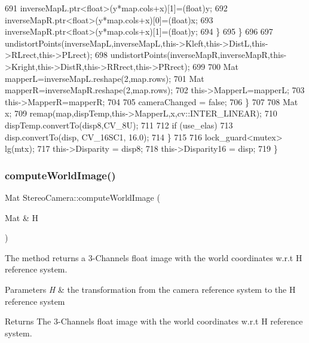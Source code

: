 \begin{DoxyCode}
691                     inverseMapL.ptr<\textcolor{keywordtype}{float}>(y*map.cols+x)[1]=(\textcolor{keywordtype}{float})y;
692                     inverseMapR.ptr<\textcolor{keywordtype}{float}>(y*map.cols+x)[0]=(\textcolor{keywordtype}{float})x;
693                     inverseMapR.ptr<\textcolor{keywordtype}{float}>(y*map.cols+x)[1]=(\textcolor{keywordtype}{float})y;
694                 \}
695             \}
696 
697             undistortPoints(inverseMapL,inverseMapL,this->Kleft,this->DistL,this->RLrect,this->PLrect);
698             undistortPoints(inverseMapR,inverseMapR,this->Kright,this->DistR,this->RRrect,this->PRrect);
699 
700             Mat mapperL=inverseMapL.reshape(2,map.rows);
701             Mat mapperR=inverseMapR.reshape(2,map.rows);
702             this->MapperL=mapperL;
703             this->MapperR=mapperR;
704 
705             cameraChanged = \textcolor{keyword}{false};
706         \}
707 
708         Mat x;
709         remap(map,dispTemp,this->MapperL,x,cv::INTER\_LINEAR);
710         dispTemp.convertTo(disp8,CV\_8U);
711 
712         \textcolor{keywordflow}{if} (use\_elas)
713             disp.convertTo(disp, CV\_16SC1, 16.0);
714     \}
715 
716     lock\_guard<mutex> lg(mtx);
717     this->Disparity = disp8;
718     this->Disparity16 = disp;
719 \}
\end{DoxyCode}
\mbox{\label{classStereoCamera_a52ef2f3401488e5c4fa6badd1336f96d}} 
\subsubsection{\texorpdfstring{compute\+World\+Image()}{computeWorldImage()}}
{\footnotesize\ttfamily Mat Stereo\+Camera\+::compute\+World\+Image (\begin{DoxyParamCaption}\item[{Mat \&}]{H }\end{DoxyParamCaption})}



The method returns a 3-\/\+Channels float image with the world coordinates w.\+r.\+t H reference system. 


\begin{DoxyParams}{Parameters}
{\em H} & the transformation from the camera reference system to the H reference system \\
\hline
\end{DoxyParams}
\begin{DoxyReturn}{Returns}
The 3-\/\+Channels float image with the world coordinates w.\+r.\+t H reference system. 
\end{DoxyReturn}


